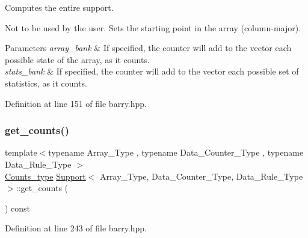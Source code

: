 Computes the entire support. 

Not to be used by the user. Sets the starting point in the array (column-\/major).


\begin{DoxyParams}{Parameters}
{\em array\+\_\+bank} & If specified, the counter will add to the vector each possible state of the array, as it counts.\\
\hline
{\em stats\+\_\+bank} & If specified, the counter will add to the vector each possible set of statistics, as it counts. \\
\hline
\end{DoxyParams}


Definition at line 151 of file barry.\+hpp.

\mbox{\label{classbarry_1_1_support_a5d93a94eaed9b1157fb934284883fd47}} 
\subsubsection{\texorpdfstring{get\+\_\+counts()}{get\_counts()}}
{\footnotesize\ttfamily template$<$typename Array\+\_\+\+Type , typename Data\+\_\+\+Counter\+\_\+\+Type , typename Data\+\_\+\+Rule\+\_\+\+Type $>$ \\
\hyperlink{namespacebarry_a3e2d8c3b6cf602107559d4237d9f1315}{Counts\+\_\+type} \hyperlink{classbarry_1_1_support}{Support}$<$ Array\+\_\+\+Type, Data\+\_\+\+Counter\+\_\+\+Type, Data\+\_\+\+Rule\+\_\+\+Type $>$\+::get\+\_\+counts (\begin{DoxyParamCaption}{ }\end{DoxyParamCaption}) const\hspace{0.3cm}{\ttfamily [inline]}}



Definition at line 243 of file barry.\+hpp.

\mbox{\label{classbarry_1_1_support_abcb4dea3c5a1b140990821900432f90e}} 
